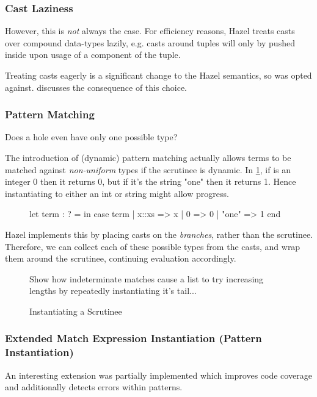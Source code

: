 \subsubsection{Cast Laziness}\label{sec:CastLaziness}
However, this is \textit{not} always the case. For efficiency reasons, Hazel treats casts over compound data-types lazily, e.g. casts around tuples will only by pushed inside upon usage of a component of the tuple.

Treating casts eagerly is a significant change to the Hazel semantics, so was opted against.  discusses the consequence of this choice. 


\subsubsection{Pattern Matching}
\label{sec:PatternMatching}
Does a hole even have only one possible type?

The introduction of (dynamic) pattern matching actually allows terms to be matched against \textit{non-uniform} types if the scrutinee is dynamic. In \cref{fig:DynamicPatternMatching}, if  is an integer 0 then it returns 0, but if it's the string "one" then it returns 1. Hence instantiating  to either an int or string might allow progress.

\begin{figure}[h]
let term : ? =   in
case term 
  | x::xs => x
  | 0 => 0
| "one" => 1 end 
\label{fig:DynamicPatternMatching}
\end{figure}

Hazel implements this by placing casts on the \textit{branches}, rather than the scrutinee. Therefore, we can collect each of these possible types from the casts, and wrap them around the scrutinee, continuing evaluation accordingly.


\begin{figure}
Show how indeterminate matches cause a list to try increasing lengths by repeatedly instantiating it's tail...
\caption{Instantiating a Scrutinee}
\end{figure}

\subsubsection{Extended Match Expression Instantiation (Pattern Instantiation)}
\label{sec:ExtendedPatternMatching}
An interesting extension was partially implemented which improves code coverage and additionally detects errors within patterns. 

